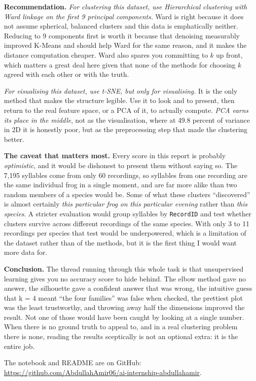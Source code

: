 \documentclass[11pt,a4paper]{article}
\begin{document}
\textbf{Recommendation.} \emph{For clustering this dataset, use Hierarchical clustering
with Ward linkage on the first 9 principal components.} Ward is right because it does not
assume spherical, balanced clusters and this data is emphatically neither. Reducing to 9
components first is worth it because that denoising measurably improved K-Means and
should help Ward for the same reason, and it makes the distance computation cheaper.
Ward also spares you committing to $k$ up front, which matters a great deal here given
that none of the methods for choosing $k$ agreed with each other or with the truth.

\emph{For visualising this dataset, use t-SNE, but only for visualising.} It is the only
method that makes the structure legible. Use it to look and to present, then return to
the real feature space, or a PCA of it, to actually compute. \emph{PCA earns its place in
the middle}, not as the visualisation, where at 49.8 percent of variance in 2D it is
honestly poor, but as the preprocessing step that made the clustering better.

\textbf{The caveat that matters most.} Every score in this report is probably
\emph{optimistic}, and it would be dishonest to present them without saying so. The 7,195
syllables come from only 60 recordings, so syllables from one recording are the same
individual frog in a single moment, and are far more alike than two random members of a
species would be. Some of what these clusters ``discovered'' is almost certainly
\emph{this particular frog on this particular evening} rather than \emph{this species}. A
stricter evaluation would group syllables by \texttt{RecordID} and test whether clusters
survive across different recordings of the same species. With only 3 to 11 recordings per
species that test would be underpowered, which is a limitation of the dataset rather than
of the methods, but it is the first thing I would want more data for.

\textbf{Conclusion.} The thread running through this whole task is that unsupervised
learning gives you no accuracy score to hide behind. The elbow method gave no answer, the
silhouette gave a confident answer that was wrong, the intuitive guess that k = 4 meant
``the four families'' was false when checked, the prettiest plot was the least
trustworthy, and throwing away half the dimensions improved the result. Not one of those
would have been caught by looking at a single number. When there is no ground truth to
appeal to, and in a real clustering problem there is none, reading the results sceptically
is not an optional extra: it is the entire job.

\vspace{0.4cm}
The notebook and README are on GitHub:
\url{https://github.com/AbdullahAmir06/ai-internship-abdullahamir}.
\end{document}
